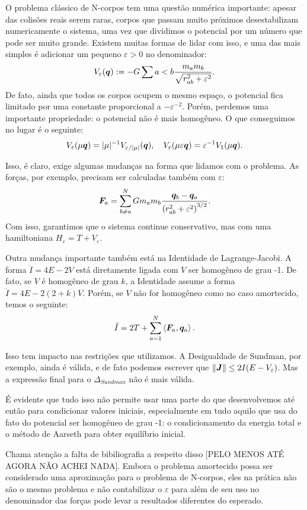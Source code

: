 O problema clássico de N-corpos tem uma questão numérica importante: apesar das colisões reais serem raras, corpos que passam muito próximos desestabilizam numericamente o sistema, uma vez que dividimos o potencial por um número que pode ser muito grande. Existem muitas formas de lidar com isso, e uma das mais simples é adicionar um pequeno $\varepsilon > 0$ no denominador:
\begin{equation}
    V_\varepsilon(\bm q) := - G \sum{a < b} \dfrac{m_a m_b}{\sqrt{r_{ab}^2 + \varepsilon^2}}.
\end{equation}
De fato, ainda que todos os corpos ocupem o mesmo espaço, o potencial fica limitado por uma constante proporcional a $-\varepsilon^{-2}$. Porém, perdemos uma importante propriedade: o potencial não é mais homogêneo. O que conseguimos no lugar é o seguinte:
\begin{equation}
    V_\varepsilon(\mu \bm q) = |\mu|^{-1} V_{\varepsilon/|\mu|} (\bm q),
    \quad
    V_\varepsilon(\mu \varepsilon \bm q) = \varepsilon^{-1} V_1(\mu \bm q).
\end{equation}

Isso, é claro, exige algumas mudanças na forma que lidamos com o problema. As forças, por exemplo, precisam ser calculadas também com $\varepsilon$:
\begin{equation}
    \bm F_a = \sum_{b \neq a}^N G m_a m_b \dfrac{\bm q_b - \bm q_a}{\left(r_{ab}^2 + \varepsilon^2 \right)^{3/2}}.
\end{equation}
Com isso, garantimos que o sistema continue conservativo, mas com uma hamiltoniana $H_\varepsilon = T + V_\varepsilon$.

Outra mudança importante também está na Identidade de Lagrange-Jacobi. A forma $\ddot I = 4E - 2V$ está diretamente ligada com $V$ ser homogêneo de grau -1. De fato, se $V$ é homogêneo de grau $k$, a Identidade assume a forma $\ddot I = 4E - 2 (2+k)V$. Porém, se $V$ não for homogêneo como no caso amortecido, temos o seguinte:
\begin{equation}
    \ddot I = 2 T + \sum_{a=1}^N \left\langle \bm F_a, \bm q_a \right\rangle.
\end{equation}

Isso tem impacto nas restrições que utilizamos. A Desigualdade de Sundman, por exemplo, ainda é válida, e de fato podemos escrever que $\left\Vert \bm J \right\Vert \leq 2 I(E - V_\varepsilon)$. Mas a expressão final para o $\Delta_{Sundman}$ não é mais válida.

É evidente que tudo isso não permite usar uma parte do que desenvolvemos até então para condicionar valores iniciais, especialmente em tudo aquilo que usa do fato do potencial ser homogêneo de grau -1: o condicionamento da energia total e o método de Aarseth para obter equilíbrio inicial.

Chama atenção a falta de bibiliografia a respeito disso [PELO MENOS ATÉ AGORA NÃO ACHEI NADA]. Embora o problema amortecido possa ser considerado uma aproximação para o problema de N-corpos, eles na prática não são o mesmo problema e não contabilizar o $\varepsilon$ para além de seu uso no denominador das forças pode levar a resultados diferentes do esperado.